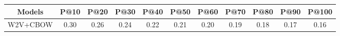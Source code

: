 \begin{tabular}{ccccccccccc}
\toprule
Models & P@10 & P@20 & P@30 & P@40 & P@50 & P@60 & P@70 & P@80 & P@90 & P@100\\
\midrule
W2V+CBOW & 0.30 & 0.26 & 0.24 & 0.22 & 0.21 & 0.20 & 0.19 & 0.18 & 0.17 & 0.16\\
\bottomrule
\end{tabular}
